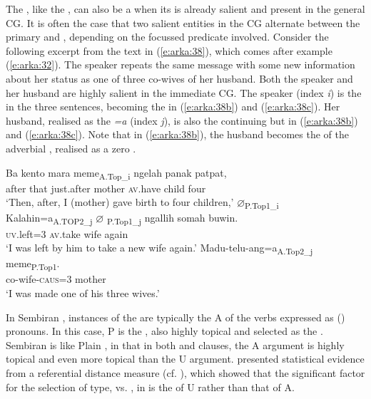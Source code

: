 \documentclass[output=paper
,modfonts
,nonflat]{langsci/langscibook}
\begin{document}
\noindent
The , like the , can also be a  when its  is already salient and present in the general CG. It is often the case that two salient entities in the CG alternate between the primary and , depending on the focussed predicate involved. Consider the following excerpt from the text in (\ref{e:arka:38}), which comes after example (\ref{e:arka:32}). The speaker repeats the same message with some new information about her status as one of three co-wives of her husband. Both the speaker and her husband are highly salient in the immediate CG. The speaker (index \textit{i}) is the  in the three sentences, becoming the  in (\ref{e:arka:38b}) and (\ref{e:arka:38c}). Her husband, realised as the  \textit{=a} (index \textit{j}), is also the continuing but  in (\ref{e:arka:38b}) and (\ref{e:arka:38c}). Note that in (\ref{e:arka:38b}), the husband becomes the  of the adverbial , realised as a zero . 

\begin{exe}
	\ex\label{e:arka:38}
	\begin{xlist}
		\ex\label{e:arka:38a}
		\gll Ba kento mara {\ob}meme{\cb}\textsubscript{A.Top\_i} ngelah panak patpat,\\
		after that just.after \phantom{[}mother \textsc{av}.have child four\\
		\glt ‘Then, after, I (mother) gave birth to four children,’
		\ex\label{e:arka:38b}
		\gll ${\varnothing}$\textsubscript{P.Top1\_i} Kalahin{\ob}=a{\cb}\textsubscript{A.TOP2\_j} {\ob}${\varnothing}$\textsubscript{ P.Top1\_j}  ngallih  somah buwin{\cb}.\\
		{} \textsc{uv}.left=3 {} \textsc{av}.take  wife again\\
		\glt ‘I was left by him to take a new wife again.’
		\ex\label{e:arka:38c}
		\gll Madu-telu-ang{\ob}=a{\cb}\textsubscript{A.Top2\_j} {\ob}meme{\cb}\textsubscript{P.Top1}.\\
		co-wife-\textsc{caus}=3 \phantom{[}mother\\
		\glt ‘I was made one of his three wives.’
	\end{xlist}
\end{exe}

\noindent
In Sembiran , instances of the  are typically the A of the  verbs expressed as () pronouns. In this case, P is the , also highly topical and selected as the . Sembiran  is like Plain , in that in both  and  clauses, the A argument is highly topical and even more topical than the U argument. \citet{Pastika2006} presented statistical evidence from a referential distance measure (cf. \citealt{Givón1994}), which showed that the significant factor for the selection of  type,  vs. , in  is the  of U rather than that of A. 
\end{document}
